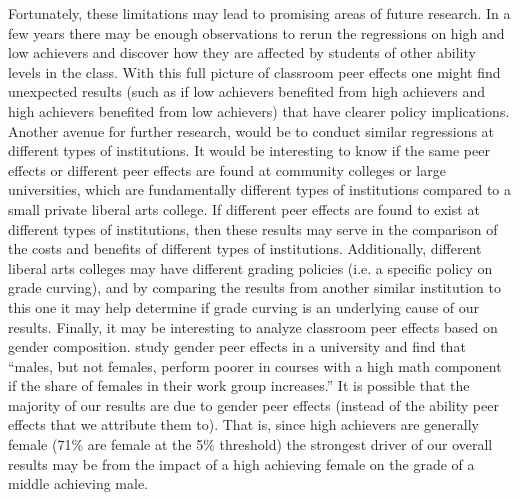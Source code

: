 Fortunately, these limitations may lead to promising areas of future research. 
In a few years there may be enough observations to rerun the regressions on high and low achievers and discover how they are affected by students of other ability levels in the class. 
With this full picture of classroom peer effects one might find unexpected results (such as if low achievers benefited from high achievers and high achievers benefited from low achievers) that have clearer policy implications.
Another avenue for further research, would be to conduct similar regressions at different types of institutions.
It would be interesting to know if the same peer effects or different peer effects are found at community colleges or large universities, which are fundamentally different types of institutions compared to a small private liberal arts college. 
If different peer effects are found to exist at different types of institutions, then these results may serve in the comparison of the costs and benefits of different types of institutions. 
Additionally, different liberal arts colleges may have different grading policies (i.e. a specific policy on grade curving), and by comparing the results from another similar institution to this one it may help determine if grade curving is an underlying cause of our results. 
Finally, it may be interesting to analyze classroom peer effects based on gender composition. 
\citet{oosterbeek2014gender} study gender peer effects in a university and find that ``males, but not females, perform poorer in courses with a high math component if the share of females in their work group increases.'' 
It is possible that the majority of our results are due to gender peer effects (instead of the ability peer effects that we attribute them to). 
That is, since high achievers are generally female (71\% are female at the 5\% threshold) the strongest driver of our overall results may be from the impact of a high achieving female on the grade of a middle achieving male. 


